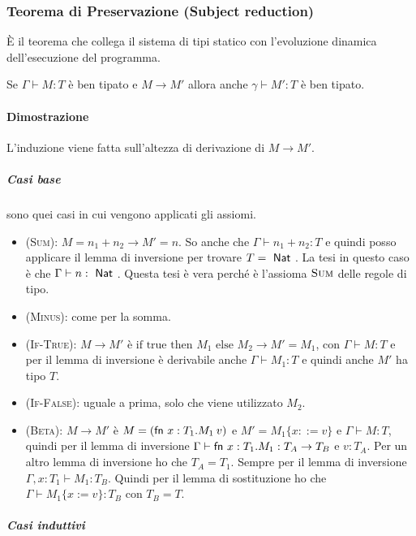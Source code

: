 \subsubsection{Teorema di Preservazione (Subject reduction)}

\`E il teorema che collega il sistema di tipi statico con l'evoluzione dinamica dell'esecuzione del programma.

\begin{center}
	Se $\Gamma \vdash M : T$ è ben tipato e $M \rightarrow M'$ allora anche $\gamma \vdash M' : T$ è ben tipato.
\end{center}

\paragraph{Dimostrazione}

L'induzione viene fatta sull'altezza di derivazione di $M \rightarrow M'$.

\subparagraph{Casi base} sono quei casi in cui vengono applicati gli assiomi.

\begin{itemize}
	\item \textsc{(Sum)}: $M = n_1 + n_2 \rightarrow M' = n$. So anche che $\Gamma \vdash n_1 + n_2 : T$ e quindi posso applicare il lemma di inversione per trovare $ T= \Nat$. La tesi in questo caso è che $\Gamma \vdash n : \Nat$. Questa tesi è vera perché è l'assioma $\textsc{Sum}$ delle regole di tipo.
	\item \textsc{(Minus)}: come per la somma.
	\item \textsc{(If-True)}: $M \rightarrow M' $ è $\text{if true then }M_1 \text{ else }M_2 \rightarrow M' = M_1$, con $\Gamma \vdash M : T$ e per il lemma di inversione è derivabile anche $\Gamma \vdash M_1 : T$ e quindi anche $M'$ ha tipo $T$.
	\item \textsc{(If-False)}: uguale a prima, solo che viene utilizzato $M_2$.
	\item \textsc{(Beta)}: $M \rightarrow M'$ è $M = (\fn x:T_1 . M_1 \: v) $ e $M' = M_1\{x ::= v\}$ e $\Gamma \vdash M : T$, quindi per il lemma di inversione $\Gamma \vdash \fn x: T_1 . M_1 : T_A \rightarrow T_B$ e $v : T_A$. Per un altro lemma di inversione ho che $T_A = T_1$. Sempre per il lemma di inversione $\Gamma, x : T_1 \vdash M_1 : T_B$. Quindi per il lemma di sostituzione ho che $\Gamma \vdash M_1\{x := v\} : T_B$ con $T_B = T$.
\end{itemize}

\subparagraph{Casi induttivi} 

